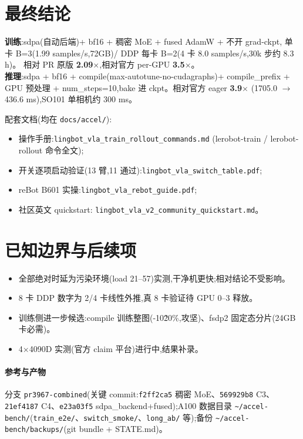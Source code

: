 \documentclass[11pt]{ctexart}
\begin{document}
\section{最终结论}
\begin{quotebox}
\textbf{训练}:sdpa(自动后端)+ bf16 + 稠密 MoE + fused AdamW + 不开 grad-ckpt,
单卡 B=3(1.99 samples/s,72GB)/ DDP 每卡 B=2(4 卡 8.0 samples/s,30k 步约 8.3 h)。
相对 PR 原版 \textbf{2.09$\times$},相对官方 per-GPU \textbf{3.5$\times$}。\\
\textbf{推理}:sdpa + bf16 + compile(max-autotune-no-cudagraphs)+ compile\_prefix
+ GPU 预处理 + num\_steps=10,bake 进 ckpt。相对官方 eager \textbf{3.9$\times$}
(1705.0 $\to$ 436.6 ms),SO101 单相机约 300 ms。
\end{quotebox}

配套文档(均在 \texttt{docs/accel/}):
\begin{itemize}[itemsep=0pt,topsep=1pt,parsep=0pt]
\item 操作手册:\texttt{lingbot\_vla\_train\_rollout\_commands.md}
(lerobot-train / lerobot-rollout 命令全文);
\item 开关逐项启动验证(13 臂,11 通过):\texttt{lingbot\_vla\_switch\_table.pdf};
\item reBot B601 实操:\texttt{lingbot\_vla\_rebot\_guide.pdf};
\item 社区英文 quickstart:\newline
\texttt{lingbot\_vla\_v2\_community\_quickstart.md}。
\end{itemize}

\section{已知边界与后续项}
\begin{itemize}[itemsep=0pt,topsep=1pt,parsep=0pt]
\item 全部绝对时延为污染环境(load 21--57)实测,干净机更快;相对结论不受影响。
\item 8 卡 DDP 数字为 2/4 卡线性外推,真 8 卡验证待 GPU 0--3 释放。
\item 训练侧进一步候选:compile 训练整图(-10\~20\%,攻坚)、fsdp2 固定态分片(24GB 卡必需)。
\item 4$\times$4090D 实测(官方 claim 平台)进行中,结果补录。
\end{itemize}

\paragraph{参考与产物} 分支 \texttt{pr3967-combined}(关键 commit:\allowbreak{}\texttt{f2ff2ca5} 稠密 MoE、\texttt{569929b8} C3、\texttt{21ef4187} C4、\texttt{e23a03f5} sdpa\_backend+fused);A100 数据目录 \texttt{\textasciitilde/accel-bench/}(\texttt{train\_e2e/}、\texttt{switch\_smoke/}、\texttt{long\_ab/} 等);备份 \texttt{\textasciitilde/accel-bench/backups/}(git bundle + STATE.md)。
\end{document}
